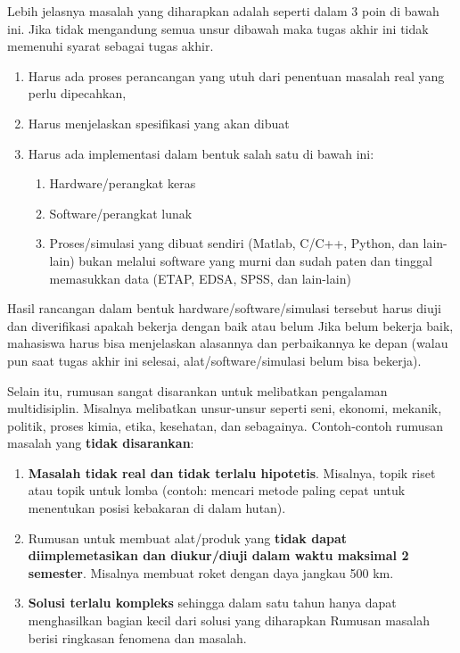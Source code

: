 Lebih jelasnya masalah yang diharapkan adalah seperti dalam 3 poin di bawah ini. Jika tidak mengandung semua unsur dibawah maka tugas akhir ini tidak memenuhi syarat sebagai tugas akhir. \par

\begin{enumerate}[noitemsep]
	\item Harus ada proses perancangan yang utuh dari penentuan masalah real yang perlu dipecahkan, 
	\item Harus menjelaskan spesifikasi yang akan dibuat
	\item Harus ada implementasi dalam bentuk salah satu di bawah ini:
	\begin{enumerate}
		\item Hardware/perangkat keras
		\item Software/perangkat lunak
		\item Proses/simulasi yang dibuat sendiri (Matlab, C/C++, Python, dan lain-lain) bukan melalui software yang murni dan sudah paten dan tinggal memasukkan data (ETAP, EDSA, SPSS, dan lain-lain)
	\end{enumerate}
\end{enumerate}

Hasil rancangan dalam bentuk hardware/software/simulasi tersebut harus diuji dan diverifikasi apakah bekerja dengan baik atau belum Jika belum bekerja baik, mahasiswa harus bisa menjelaskan alasannya dan perbaikannya ke depan (walau pun saat tugas akhir ini selesai, alat/software/simulasi belum bisa bekerja).\par

Selain itu, rumusan sangat disarankan untuk melibatkan pengalaman multidisiplin. Misalnya melibatkan unsur-unsur seperti seni, ekonomi, mekanik, politik, proses kimia, etika, kesehatan, dan sebagainya. Contoh-contoh rumusan masalah yang \textbf{tidak disarankan}: \par

\begin{enumerate}[noitemsep]
	\item \textbf{Masalah tidak real dan tidak terlalu hipotetis}. Misalnya, topik riset atau topik untuk lomba (contoh: mencari metode paling cepat untuk menentukan posisi kebakaran di dalam hutan).
	\item Rumusan untuk membuat alat/produk yang \textbf{tidak dapat diimplemetasikan dan diukur/diuji dalam waktu maksimal 2 semester}. Misalnya membuat roket dengan daya jangkau 500 km.
	\item \textbf{Solusi terlalu kompleks} sehingga dalam satu tahun hanya dapat menghasilkan bagian kecil dari solusi yang diharapkan Rumusan masalah berisi ringkasan fenomena dan masalah.
\end{enumerate}


